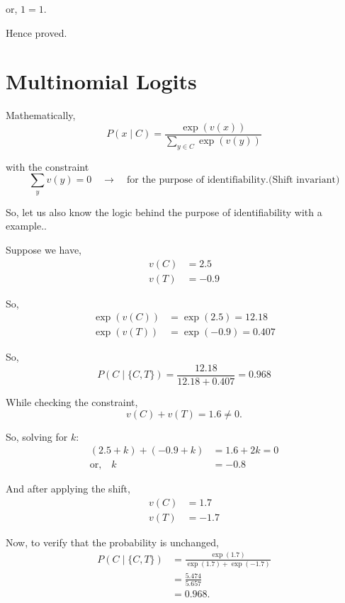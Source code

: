 \documentclass{article}
\begin{document}
or, \quad $1 = 1$.

Hence proved.
\section{Multinomial Logits}

Mathematically,
\begin{equation*}
    P(x \mid C) = \frac{\exp(v(x))}{\displaystyle\sum_{y \in C} \exp(v(y))}
\end{equation*}

with the constraint
\begin{equation*}
    \sum_{y} v(y) = 0 \quad \rightarrow \quad \text{for the purpose of identifiability.(Shift invariant)}
\end{equation*}

So, let us also know the logic behind the purpose of identifiability with a example..

Suppose we have,
\begin{align*}
    v(C) &= 2.5 \\
    v(T) &= -0.9
\end{align*}

So,
\begin{align*}
    \exp(v(C)) &= \exp(2.5) = 12.18 \\
    \exp(v(T)) &= \exp(-0.9) = 0.407
\end{align*}

So,
\begin{equation*}
    P(C \mid \{C,T\}) = \frac{12.18}{12.18 + 0.407} = 0.968
\end{equation*}

While checking the constraint,
\begin{equation*}
    v(C) + v(T) = 1.6 \neq 0.
\end{equation*}

So, solving for $k$:
\begin{align*}
    (2.5+k) + (-0.9+k) &= 1.6 + 2k = 0 \\
    \text{or,} \quad k &= -0.8
\end{align*}

And after applying the shift,
\begin{align*}
    v(C) &= 1.7 \\
    v(T) &= -1.7
\end{align*}

Now, to verify that the probability is unchanged,
\begin{align*}
    P(C \mid \{C,T\}) &= \frac{\exp(1.7)}{\exp(1.7) + \exp(-1.7)} \\
    &= \frac{5.474}{5.657} \\
    &= 0.968.
\end{align*}
\end{document}
